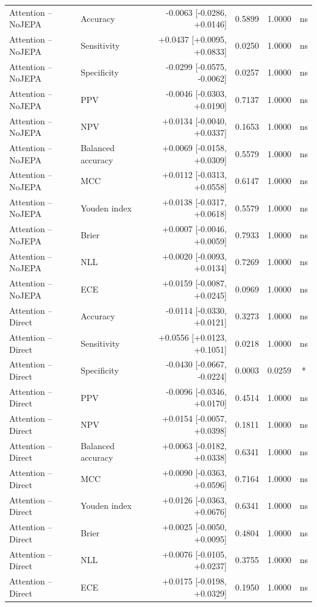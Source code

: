 \begin{table}[t]
\begin{tabular}{llrrrc}
Attention -- NoJEPA & Accuracy & -0.0063 [-0.0286, +0.0146] & 0.5899 & 1.0000 & ns \\
Attention -- NoJEPA & Sensitivity & +0.0437 [+0.0095, +0.0833] & 0.0250 & 1.0000 & ns \\
Attention -- NoJEPA & Specificity & -0.0299 [-0.0575, -0.0062] & 0.0257 & 1.0000 & ns \\
Attention -- NoJEPA & PPV & -0.0046 [-0.0303, +0.0190] & 0.7137 & 1.0000 & ns \\
Attention -- NoJEPA & NPV & +0.0134 [-0.0040, +0.0337] & 0.1653 & 1.0000 & ns \\
Attention -- NoJEPA & Balanced accuracy & +0.0069 [-0.0158, +0.0309] & 0.5579 & 1.0000 & ns \\
Attention -- NoJEPA & MCC & +0.0112 [-0.0313, +0.0558] & 0.6147 & 1.0000 & ns \\
Attention -- NoJEPA & Youden index & +0.0138 [-0.0317, +0.0618] & 0.5579 & 1.0000 & ns \\
Attention -- NoJEPA & Brier & +0.0007 [-0.0046, +0.0059] & 0.7933 & 1.0000 & ns \\
Attention -- NoJEPA & NLL & +0.0020 [-0.0093, +0.0134] & 0.7269 & 1.0000 & ns \\
Attention -- NoJEPA & ECE & +0.0159 [-0.0087, +0.0245] & 0.0969 & 1.0000 & ns \\
Attention -- Direct & Accuracy & -0.0114 [-0.0330, +0.0121] & 0.3273 & 1.0000 & ns \\
Attention -- Direct & Sensitivity & +0.0556 [+0.0123, +0.1051] & 0.0218 & 1.0000 & ns \\
Attention -- Direct & Specificity & -0.0430 [-0.0667, -0.0224] & 0.0003 & 0.0259 & * \\
Attention -- Direct & PPV & -0.0096 [-0.0346, +0.0170] & 0.4514 & 1.0000 & ns \\
Attention -- Direct & NPV & +0.0154 [-0.0057, +0.0398] & 0.1811 & 1.0000 & ns \\
Attention -- Direct & Balanced accuracy & +0.0063 [-0.0182, +0.0338] & 0.6341 & 1.0000 & ns \\
Attention -- Direct & MCC & +0.0090 [-0.0363, +0.0596] & 0.7164 & 1.0000 & ns \\
Attention -- Direct & Youden index & +0.0126 [-0.0363, +0.0676] & 0.6341 & 1.0000 & ns \\
Attention -- Direct & Brier & +0.0025 [-0.0050, +0.0095] & 0.4804 & 1.0000 & ns \\
Attention -- Direct & NLL & +0.0076 [-0.0105, +0.0237] & 0.3755 & 1.0000 & ns \\
Attention -- Direct & ECE & +0.0175 [-0.0198, +0.0329] & 0.1950 & 1.0000 & ns \\
\bottomrule
\end{tabular}
\end{table}
